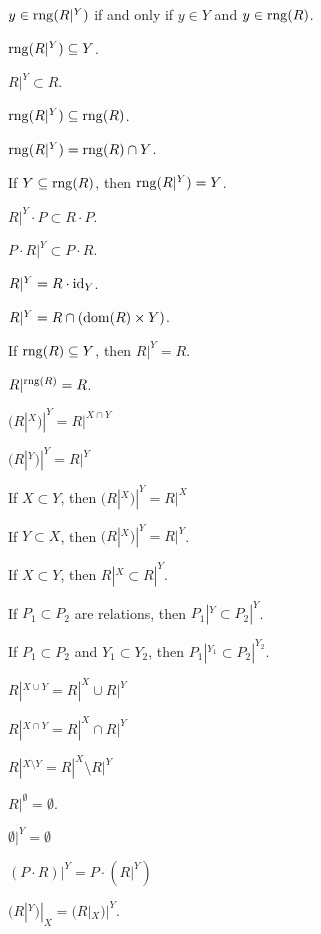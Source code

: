 \documentclass{article}
\begin{document}
\begin{thm}
\item\label{relat1:84} $y\in\operatorname{rng}(R|^{Y})$ if and only if $y\in Y$ and $y\in\operatorname{rng}(R)$.
\item\label{relat1:85} $\operatorname{rng}(R|^{Y})\subseteq Y$.
\item\label{relat1:86} $R|^{Y}\subset R$.
\item\label{relat1:87} $\operatorname{rng}(R|^{Y})\subseteq\operatorname{rng}(R)$.
\item\label{relat1:88} $\operatorname{rng}(R|^{Y})=\operatorname{rng}(R)\cap Y$.
\item\label{relat1:89} If $Y\subseteq\operatorname{rng}(R)$, then $\operatorname{rng}(R|^{Y})=Y$.
\item\label{relat1:90} $R|^{Y}\cdot P\subset R\cdot P$.
\item\label{relat1:91} $P\cdot R|^{Y}\subset P\cdot R$.
\item\label{relat1:92} $R|^{Y}=R\cdot\operatorname{id}_{Y}$.
\item\label{relat1:93} $R|^{Y}=R\cap(\operatorname{dom}(R)\times Y)$.
\item\label{relat1:94} If $\operatorname{rng}(R)\subseteq Y$, then $R|^{Y}=R$.
\item\label{relat1:95} $R|^{\operatorname{rng}(R)}=R$.
\item\label{relat1:96} $(R|^{X})|^{Y} = R|^{X\cap Y}$
\item\label{relat1:97} $(R|^{Y})|^{Y}=R|^{Y}$
\item\label{relat1:98} If $X\subset Y$, then $(R|^{X})|^{Y}=R|^{X}$
\item\label{relat1:99} If $Y\subset X$, then
  $(R|^{X})|^{Y}=R|^{Y}$.
\item\label{relat1:100} If $X\subset Y$, then
  $R|^{X}\subset R|^{Y}$.
\item\label{relat1:101} If $P_{1}\subset P_{2}$ are relations,
  then $P_{1}|^{Y}\subset P_{2}|^{Y}$.
\item\label{relat1:102} If $P_{1}\subset P_{2}$ and $Y_{1}\subset Y_{2}$,
  then $P_{1}|^{Y_{1}}\subset P_{2}|^{Y_{2}}$.
\item\label{relat1:103} $R|^{X\cup Y}=R|^{X}\cup R|^{Y}$
\item\label{relat1:104} $R|^{X\cap Y}=R|^{X}\cap R|^{Y}$
\item\label{relat1:105} $R|^{X\setminus Y}=R|^{X}\setminus R|^{Y}$
\item\label{relat1:106} $R|^{\emptyset}=\emptyset$.
\item\label{relat1:107} $\emptyset|^{Y}=\emptyset$
\item\label{relat1:108} $(P\cdot R)|^{Y}=P\cdot(R|^{Y})$
\item\label{relat1:109} $(R|^{Y})|_{X}=(R|_{X})|^{Y}$.
\end{thm}
\end{document}
